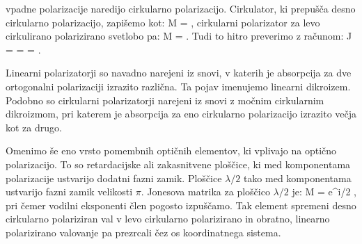 vpadne polarizacije naredijo cirkularno polarizacijo. Cirkulator, ki
prepušča desno cirkularno polarizacijo, zapišemo kot:
\beq
M = \left[\begin{array}{cc}
1 & i \\
-i & 1\\
\end{array}\right]\!\!, 
\label{eq:03_52}
\eeq
cirkularni polarizator za levo cirkulirano polarizirano svetlobo pa:
\beq
M = \left[\begin{array}{cc}
1 & -i \\
i & 1\\
\end{array}\right]\!\!.
\label{eq:03_53}
\eeq
Tudi to hitro preverimo z računom:
\beq
J = \left[\begin{array}{cc}
1 & \pm i \\
\mp i & 1\\
\end{array}\right]\cdot 
\left[\begin{array}{c}
J_{1x}\\
J_{1y}\\
\end{array}\right]\!\! = 
\left[\begin{array}{c}
J_{1x} \pm i J_{1y}\\
\mp i J_{1x} + J_{1y}\\
\end{array}\right]\!\!=
\left[\begin{array}{c}
1\\
\mp i\\
\end{array}\right]\!\!.
\label{eq:03_54}
\eeq

\begin{remark}
Linearni polarizatorji so navadno narejeni iz snovi, v
katerih je absorpcija za dve ortogonalni polarizaciji izrazito različna.
Ta pojav imenujemo linearni dikroizem. Podobno so cirkularni polarizatorji
narejeni iz snovi z močnim cirkularnim dikroizmom, pri katerem je absorpcija
za eno cirkularno polarizacijo izrazito večja kot za drugo.
\end{remark}

Omenimo še eno vrsto pomembnih optičnih elementov, ki vplivajo na optično
polarizacijo. To so retardacijske ali zakasnitvene ploščice, ki med 
komponentama polarizacije ustvarijo dodatni fazni zamik. 
Ploščice $\lambda/2$ tako med komponentama
ustvarijo fazni zamik velikosti $\pi$. Jonesova matrika za ploščico $\lambda/2$ je:
\beq
M = e^{\pm i\pi/2}
\left[\begin{array}{cc}
1 & 0 \\
0 & -1\\
\end{array}\right]\!\!,
\label{eq:03_55}
\eeq
pri čemer vodilni eksponenti člen pogosto izpuščamo. 
Tak element spremeni desno cirkularno polariziran val v levo cirkularno polarizirano
in obratno, linearno polarizirano valovanje pa prezrcali čez os koordinatnega sistema.

